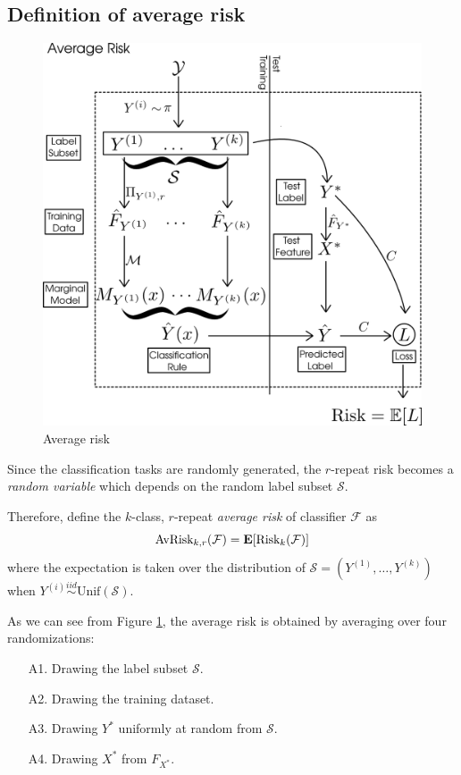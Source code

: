 \documentclass[12pt]{article}
\begin{document}
\subsection{Definition of average risk}\label{sec:average_risk}

\begin{figure}[h]
\centering
\includegraphics[scale = 0.3]{extrapolation_figures/average_risk.png}
\caption{Average risk}\label{fig:average_risk}
\end{figure}

Since the classification tasks are randomly generated, the $r$-repeat
risk becomes a \emph{random variable} which depends on the random
label subset $\mathcal{S}$.

Therefore, define the $k$-class, $r$-repeat \emph{average risk} of
classifier $\mathcal{F}$ as
\[
\text{AvRisk}_{k, r}(\mathcal{F}) = \textbf{E}[\text{Risk}_k(\mathcal{F})]
\]
where the expectation is taken over the distribution of $\mathcal{S} =
(Y^{(1)},\hdots, Y^{(k)})$ when $Y^{(i)} \stackrel{iid}{\sim} \text{Unif}(\mathcal{S}).$

As we can see from Figure \ref{fig:average_risk}, the average risk is obtained by averaging
over four randomizations:
\begin{enumerate}
\item[A1.] Drawing the label subset $\mathcal{S}$.
\item[A2.] Drawing the training dataset.
\item[A3.] Drawing $Y^*$ uniformly at random from $\mathcal{S}$.
\item[A4.] Drawing $X^*$ from $F_{X^*}$.
\end{enumerate}
\end{document}
